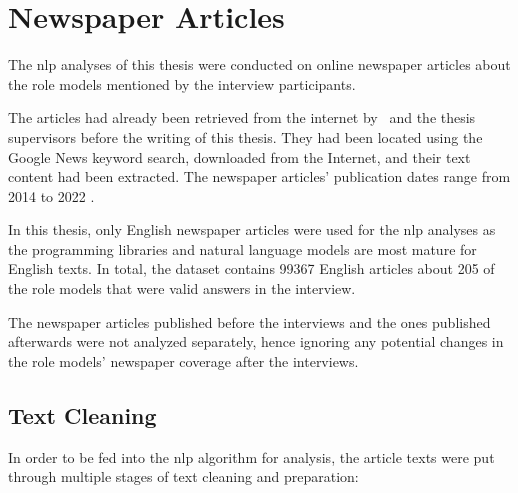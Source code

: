 \section{Newspaper Articles}
The \gls{nlp} analyses of this thesis were conducted on online newspaper articles about the role models mentioned by the interview participants.

The articles had already been retrieved from the internet by~\textcite{fenske_using_2022} and the thesis supervisors before the writing of this thesis. They had been located using the Google News keyword search, downloaded from the Internet, and their text content had been extracted. The newspaper articles' publication dates range from 2014 to 2022 \autocite{fenske_using_2022}.

In this thesis, only English newspaper articles were used for the \gls{nlp} analyses as the programming libraries and natural language models are most mature for English texts. In total, the dataset contains \SI{99367}{} English articles about \SI{205}{} of the role models that were valid answers in the interview.

The newspaper articles published before the interviews and the ones published afterwards were not analyzed separately, hence ignoring any potential changes in the role models' newspaper coverage after the interviews.


\subsection*{Text Cleaning}
In order to be fed into the \gls{nlp} algorithm for analysis, the article texts were put through multiple stages of text cleaning and preparation:

